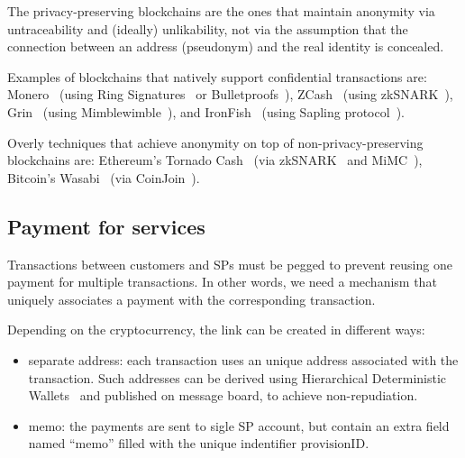 \documentclass[pdftex,twocolumn,epjc3]{svjour3}
\begin{document}
{\begin{figure}[h!]
\label{fig:anonymity-diagram}
\end{figure}

The privacy-preserving blockchains are the ones that maintain anonymity via untraceability and (ideally) unlikability, not via the assumption that the connection between an address (pseudonym) and the real identity is concealed.   

Examples of blockchains that natively support confidential transactions are: Monero~\cite{vansaberhagenCryptoNote2013} (using Ring Signatures~\cite{noetherRingSignatureConfidential2015} or Bulletproofs~\cite{bunzBulletproofsShortProofs2018}), ZCash~\cite{ben-sassonZerocashDecentralizedAnonymous2014} (using zkSNARK~\cite{ben-sassonSNARKsVerifyingProgram2013}), Grin~\cite{fuchsbauerAggregateCashSystems2019} (using Mimblewimble~\cite{jedusorMIMBLEWIMBLE2016}), and IronFish~\cite{ironfishPrivateAnonymousEasy} (using Sapling protocol~\cite{hopwoodZcashSaplingProtocol2022}).

Overly techniques that achieve anonymity on top of non-privacy-preserving blockchains are: Ethereum's Tornado Cash~\cite{pertsevTornadoCashPrivacy2019} (via zkSNARK~\cite{grothSizePairingbasedNoninteractive2016} and MiMC~\cite{albrechtMiMCEfficientEncryption2016}), Bitcoin's Wasabi~\cite{wasabiwalletBitcoinPrivacyWallet} (via CoinJoin~\cite{maxwellCoinJoinBitcoinPrivacy2013}).

\subsection{Payment for services}\label{payment-for-services}
Transactions between customers and SPs must be pegged to prevent reusing one payment for multiple transactions. 
In other words, we need a mechanism that uniquely associates a payment with the corresponding transaction.

Depending on the cryptocurrency, the link can be created in different
ways:

\begin{itemize}

\item separate address: each transaction uses an unique address associated with the transaction. Such addresses can be derived using Hierarchical Deterministic Wallets~\cite{wuilleBIP32HierarchicalDeterministic2012} and published on message board, to achieve non-repudiation.
\item memo: the payments are sent to sigle SP account, but contain an extra field named ``memo'' filled with the unique indentifier $\textrm{provisionID}$. 
\end{itemize}

}
\end{document}
